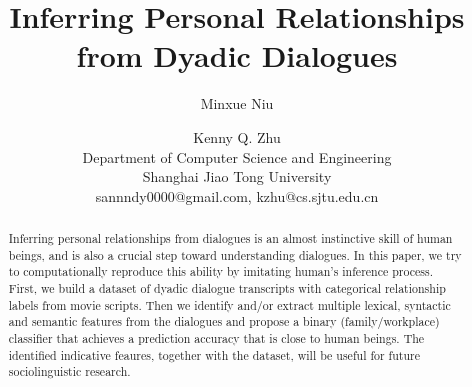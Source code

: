 \documentclass[11pt,a4paper,table]{article}
\begin{document}
	
	\title{Inferring Personal Relationships from Dyadic Dialogues}
	\author{Minxue Niu \and Kenny Q. Zhu\\
		Department of Computer Science and Engineering\\
		Shanghai Jiao Tong University \\ sannndy0000@gmail.com, kzhu@cs.sjtu.edu.cn}
	\maketitle
\begin{abstract}
Inferring personal relationships from dialogues is an almost instinctive 
skill of human beings, and is also a crucial step toward understanding 
dialogues. In this paper, we try to computationally reproduce this ability 
by imitating human's inference process. First, we build a dataset of dyadic 
dialogue transcripts with categorical relationship labels from movie scripts. 
Then we identify and/or extract multiple lexical, syntactic and 
semantic features from the dialogues and propose a binary
(family/workplace) classifier that achieves a prediction
accuracy that is close to human beings. The identified indicative feaures,
together with the dataset, will be useful for future sociolinguistic research.
\end{abstract}














\end{document}
